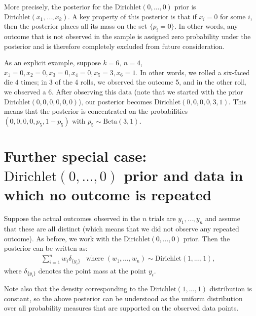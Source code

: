 \documentclass{scrartcl}
\begin{document}
More precisely, the posterior for the
$\text{Dirichlet}(0, \dots, 0)$ prior is $\text{Dirichlet}(x_1,
\dots, x_k)$. A key property of this posterior is that if $x_i = 0$ for
some $i$, then the posterior
places all its mass on the set $\{p_i = 0\}$. In other words, any
outcome that is not observed in the sample is assigned zero
probability under the posterior and is therefore completely excluded
from future consideration.

As an explicit example, suppose $k = 6$, $n = 4$, $x_1 = 0, x_2 = 0,
x_3 = 0, x_4 = 0, x_5 = 3, x_6 = 1$. In other words, we rolled a
six-faced die $4$ times; in 3 of the 4 rolls, we observed the outcome
5, and in the other roll, we observed a 6. After observing this data
(note that we started with the prior $\text{Dirichlet}(0, 0, 0, 0, 0,
0)$), our posterior becomes $\text{Dirichlet}(0, 0, 0, 0, 3, 1)$. This
means that the posterior is concentrated on the probabilities $(0, 0,
0, 0, p_5, 1 - p_5)$ with $p_5 \sim \text{Beta}(3, 1)$.

\section{Further special case: $\text{Dirichlet}(0, \dots, 0)$ prior
  and data in which no outcome is repeated}

Suppose the actual outcomes observed in the $n$ trials are $y_1,
\dots, y_n$ and assume that these are all distinct (which means that
we did not observe any repeated outcome). As before, we work with the
$\text{Dirichlet}(0, \dots, 0)$ prior. Then the posterior can be
written as:
\begin{align*}
  \sum_{i=1}^n w_i \delta_{\{y_i\}} ~~ \text{ where } (w_1, \dots,
  w_n) \sim \text{Dirichlet}(1, \dots, 1), 
\end{align*}
where $\delta_{\{y_i\}}$ denotes the point mass at the point $y_i$. 

Note also that the density corresponding to the $\text{Dirichlet}(1,
\dots, 1)$ distribution is constant, so the above posterior can be
understood as the uniform distribution over all probability measures
that are supported on the observed data points.
\end{document}
